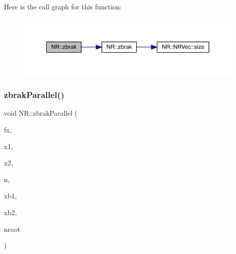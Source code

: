 Here is the call graph for this function\+:
\nopagebreak
\begin{figure}[H]
\begin{center}
\leavevmode
\includegraphics[width=350pt]{da/d46/namespaceNR_ac611c5e25767065397e735aab1a07bf8_cgraph}
\end{center}
\end{figure}
\mbox{\label{namespaceNR_a2cabd01c9ff7c4250cefe4cb1d545f49}} 
\subsubsection{\texorpdfstring{zbrakParallel()}{zbrakParallel()}\hspace{0.1cm}{\footnotesize\ttfamily [1/2]}}
{\footnotesize\ttfamily void N\+R\+::zbrak\+Parallel (\begin{DoxyParamCaption}\item[{const \mbox{\hyperlink{classNR_1_1ScalFunc}{Scal\+Func}} \&}]{fx,  }\item[{const \mbox{\hyperlink{namespaceNR_af6ff762dd605ff477b8e52387253a02a}{DP}}}]{x1,  }\item[{const \mbox{\hyperlink{namespaceNR_af6ff762dd605ff477b8e52387253a02a}{DP}}}]{x2,  }\item[{const int}]{n,  }\item[{\mbox{\hyperlink{namespaceNR_a970094d23441f8ef6a45282a7eb2103d}{Vec\+\_\+\+O\+\_\+\+DP}} \&}]{xb1,  }\item[{\mbox{\hyperlink{namespaceNR_a970094d23441f8ef6a45282a7eb2103d}{Vec\+\_\+\+O\+\_\+\+DP}} \&}]{xb2,  }\item[{int \&}]{nroot }\end{DoxyParamCaption})}

